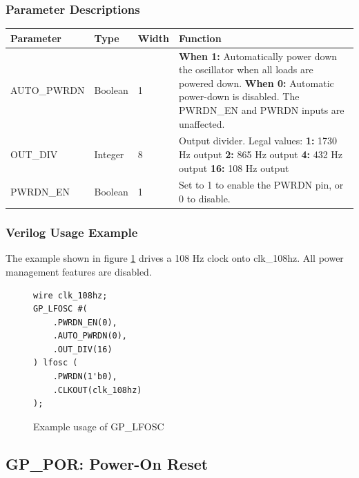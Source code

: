 \documentclass{article}
\begin{document}
\subsubsection{Parameter Descriptions}

\begin{tabularx}{5in}{|l|l|l|X|}
\hline
{\bfseries Parameter} & {\bfseries Type} & {\bfseries Width} & {\bfseries Function} \\
\hline
AUTO\_PWRDN & Boolean & 1 & 
	{\bfseries When 1: } \newline Automatically power down the oscillator when all loads are powered down. \newline
	{\bfseries When 0: } \newline Automatic power-down is disabled. The PWRDN\_EN and PWRDN inputs are unaffected.\\
\hline
OUT\_DIV & Integer & 8 &
	Output divider. Legal values: \newline
	{\bfseries 1:} 1730 Hz output \newline
	{\bfseries 2:} 865 Hz output \newline
	{\bfseries 4:} 432 Hz output \newline
	{\bfseries 16:} 108 Hz output
\\
\hline
PWRDN\_EN & Boolean & 1 & Set to 1 to enable the PWRDN pin, or 0 to disable. \\
\hline
\end{tabularx}

\subsubsection{Verilog Usage Example}

The example shown in figure \ref{gp-lfosc-example} drives a 108 Hz clock onto clk\_108hz. All power management features 
are disabled.

\begin{figure}[h]
\begin{lstlisting}
wire clk_108hz;
GP_LFOSC #(
	.PWRDN_EN(0),
	.AUTO_PWRDN(0),
	.OUT_DIV(16)
) lfosc (
	.PWRDN(1'b0),
	.CLKOUT(clk_108hz)
);
\end{lstlisting}
\caption{Example usage of GP\_LFOSC}
\label{gp-lfosc-example}
\end{figure}


\pagebreak
\clearpage
\subsection{GP\_POR: Power-On Reset}
\end{document}
